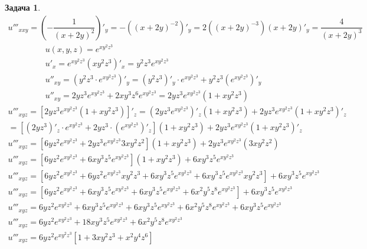 \documentclass[a4paper,fleqn,12pt]{article}
\newtheorem{task}{Задача}[section]
\begin{document}
\begin{task}
\begin{gather*}
u'''_{xxy} = \left( -\dfrac{1}{(x + 2y)^2} \right)'_y = -((x+2y)^{-2})'_y = 2((x+2y)^{-3})(x+2y)'_y = \dfrac{4}{(x+2y)^3}
\end{gather*}
\begin{gather*}
u(x,y,z) = e^{xy^2z^3}\\
u'_x =  e^{xy^2z^3}(xy^2z^3)'_x = y^2z^3e^{xy^2z^3}\\
u''_{xy} = (y^2z^3 \cdot e^{xy^2z^3})'_y = (y^2z^3)'_y \cdot e^{xy^2z^3} + y^2z^3 (e^{xy^2z^3})'_y\\
u''_{xy} = 2yz^3e^{xy^2z^3} + 2xy^3z^6e^{xy^2z^3} =  2yz^3e^{xy^2z^3} (1 + xy^2z^3)
\end{gather*}
\begin{gather*}
u'''_{xyz} = \left[ 2yz^3e^{xy^2z^3} (1 + xy^2z^3) \right]'_z = (2yz^3e^{xy^2z^3})'_z (1 + xy^2z^3) + 2yz^3e^{xy^2z^3}(1 + xy^2z^3)'_z\\
=  \left[(2yz^3)'_z\cdot e^{xy^2z^3}+ 2yz^3 \cdot (e^{xy^2z^3})'_z\right] (1 + xy^2z^3) + 2yz^3e^{xy^2z^3}(1 + xy^2z^3)'_z \\
u'''_{xyz} = \left[6yz^2e^{xy^2z^3} +  2yz^3e^{xy^2z^3}3xy^2z^2 \right] (1 + xy^2z^3) + 2yz^3e^{xy^2z^3} (3xy^2z^2) \\
u'''_{xyz} =  \left[6yz^2e^{xy^2z^3} +  6xy^3z^5e^{xy^2z^3} \right] (1 + xy^2z^3) + 6xy^3z^5e^{xy^2z^3} \\
u'''_{xyz} = \left[6yz^2e^{xy^2z^3} + 6yz^2e^{xy^2z^3} xy^2z^3 + 6xy^3z^5e^{xy^2z^3} + 6xy^3z^5e^{xy^2z^3} xy^2z^3\right] + 6xy^3z^5e^{xy^2z^3}\\
u'''_{xyz} = \left[6yz^2e^{xy^2z^3} + 6xy^3z^5e^{xy^2z^3} + 6xy^3z^5e^{xy^2z^3} + 6x^2y^5z^8e^{xy^2z^3}\right] + 6xy^3z^5e^{xy^2z^3}\\
u'''_{xyz} = 6yz^2e^{xy^2z^3} + 6xy^3z^5e^{xy^2z^3} + 6xy^3z^5e^{xy^2z^3} + 6x^2y^5z^8e^{xy^2z^3}+ 6xy^3z^5e^{xy^2z^3}\\
u'''_{xyz} = 6yz^2e^{xy^2z^3} + 18xy^3z^5e^{xy^2z^3} + 6x^2y^5z^8e^{xy^2z^3}\\
u'''_{xyz} = 6yz^2e^{xy^2z^3} \left[1 + 3xy^2z^3 + x^2y^4z^6 \right]
\end{gather*}
\end{task}
\end{document}
